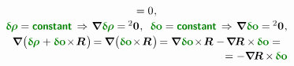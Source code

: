 \begin{equation*}
\begin{array}{c}
= 0 \hspace{.1ex} ,
\\[.2em]
%
\constvarvector{\hspace{-0.1ex}\bm{\rho}} = \boldconstant
\hspace{.4ex} \Rightarrow \hspace{.2ex}
\boldnabla \hspace{.1ex} \constvarvector{\hspace{-0.1ex}\bm{\rho}} =  \hspace{-0.12ex} {^2\bm{0}} \hspace{.1ex} ,
\;\:
\constvarvector{o} = \boldconstant
\hspace{.4ex} \Rightarrow \hspace{.2ex}
\boldnabla \hspace{.1ex} \constvarvector{o} = \hspace{-0.12ex} {^2\bm{0}} \hspace{.1ex} ,
\\[.2em]
%
\boldnabla \hspace{.1ex} \bigl(
\constvarvector{\hspace{-0.1ex}\bm{\rho}} \hspace{.1ex} +
\constvarvector{o} \hspace{-0.33ex} \times \hspace{-0.33ex} \bm{R} \hspace{.2ex} \bigr) \hspace{-0.25ex}
= \hspace{-0.1ex} \boldnabla \hspace{.1ex} \bigl(
\constvarvector{o} \hspace{-0.33ex} \times \hspace{-0.33ex} \bm{R} \hspace{.2ex} \bigr) \hspace{-0.25ex}
= \boldnabla \hspace{.1ex} \constvarvector{o} \hspace{-0.33ex} \times \hspace{-0.33ex} \bm{R}
\hspace{.1ex} - \hspace{-0.2ex}
\boldnabla \hspace{-0.2ex} \bm{R} \times \hspace{-0.2ex} \constvarvector{o} =
\\[.1em] %
\hspace*{\fill}
= - \boldnabla \hspace{-0.2ex} \bm{R} \hspace{-0.1ex} \times \hspace{-0.2ex} \constvarvector{o}

\end{array}
\end{equation*}
